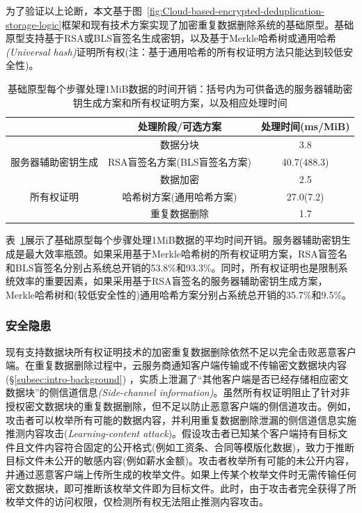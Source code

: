 为了验证以上论断，本文基于图~\ref{fig:Cloud-based-encrypted-deduplication-storage-logic}框架和现有技术方案实现了加密重复数据删除系统的基础原型。基础原型支持基于RSA或BLS盲签名生成密钥，以及基于Merkle哈希树或通用哈希\textit{(Universal hash)}证明所有权(注：基于通用哈希的所有权证明方法只能达到较低安全性)。

\begin{table}[!htb]
    \small
    \centering
    \caption{基础原型每个步骤处理1MiB数据的时间开销：括号内为可供备选的服务器辅助密钥生成方案和所有权证明方案，以及相应处理时间}
    \label{tab:intro-bottleneck}
    \begin{tabular}{@{}ccc@{}}
        \toprule
                                    & 处理阶段/可选方案            & 处理时间(ms/MiB) \\ \midrule
                                    & 数据分块                     & 3.8              \\
        服务器辅助密钥生成          & RSA盲签名方案(BLS盲签名方案) & 40.7(488.3)      \\
        \multirow{3}{*}{所有权证明} & 数据加密                     & 2.5              \\
                                    & 哈希树方案(通用哈希方案)     & 27.0(7.2)        \\
                                    & 重复数据删除                 & 1.7              \\ \bottomrule
    \end{tabular}
\end{table}

表~\ref{tab:intro-bottleneck}展示了基础原型每个步骤处理1MiB数据的平均时间开销。服务器辅助密钥生成是最大效率瓶颈。如果采用基于Merkle哈希树的所有权证明方案，RSA盲签名和BLS盲签名分别占系统总开销的53.8\%和93.3\%。同时，所有权证明也是限制系统效率的重要因素，如果采用基于RSA盲签名的服务器辅助密钥生成方案，Merkle哈希树和(较低安全性的)通用哈希方案分别占系统总开销的35.7\%和9.5\%。

\subsubsection{安全隐患}
\label{subsubsec:intro-problem-security}

现有支持数据块所有权证明技术的加密重复数据删除依然不足以完全击败恶意客户端。在重复数据删除过程中，云服务商通知客户端传输或不传输密文数据块内容(\S\ref{subsec:intro-background}) ，实质上泄漏了“其他客户端是否已经存储相应密文数据块”的侧信道信息\textit{(Side-channel information)}。虽然所有权证明阻止了针对非授权密文数据块的重复数据删除，但不足以防止恶意客户端的侧信道攻击。例如，攻击者可以枚举所有可能的数据内容，并利用重复数据删除泄漏的侧信道信息实施推测内容攻击(\textit{Learning-content attack})。假设攻击者已知某个客户端持有目标文件且文件内容符合固定的公开格式(例如工资条、合同等模版化数据)，致力于推断目标文件未公开的敏感内容(例如薪水金额)。攻击者枚举所有可能的未公开内容，并通过恶意客户端上传所生成的枚举文件。如果上传某个枚举文件时无需传输任何密文数据块，即可推断该枚举文件即为目标文件。此时，由于攻击者完全获得了所枚举文件的访问权限，仅检测所有权无法阻止推测内容攻击。

